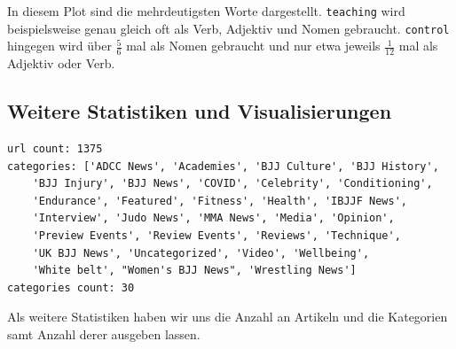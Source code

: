 \noindent In diesem Plot sind die mehrdeutigsten Worte dargestellt. \texttt{teaching} wird beispielsweise genau gleich oft als Verb, Adjektiv und Nomen gebraucht. \texttt{control} hingegen wird über $\frac{5}{6}$ mal als Nomen gebraucht und nur etwa jeweils $\frac{1}{12}$ mal als Adjektiv oder Verb.

\subsection{Weitere Statistiken und Visualisierungen}

{\color{MidnightBlue}
\begin{lstlisting}
url count: 1375
categories: ['ADCC News', 'Academies', 'BJJ Culture', 'BJJ History',
	'BJJ Injury', 'BJJ News', 'COVID', 'Celebrity', 'Conditioning',
	'Endurance', 'Featured', 'Fitness', 'Health', 'IBJJF News',
	'Interview', 'Judo News', 'MMA News', 'Media', 'Opinion',
	'Preview Events', 'Review Events', 'Reviews', 'Technique',
	'UK BJJ News', 'Uncategorized', 'Video', 'Wellbeing',
	'White belt', "Women's BJJ News", 'Wrestling News']
categories count: 30
\end{lstlisting}}

\noindent Als weitere Statistiken haben wir uns die Anzahl an Artikeln und die Kategorien samt Anzahl derer ausgeben lassen.

